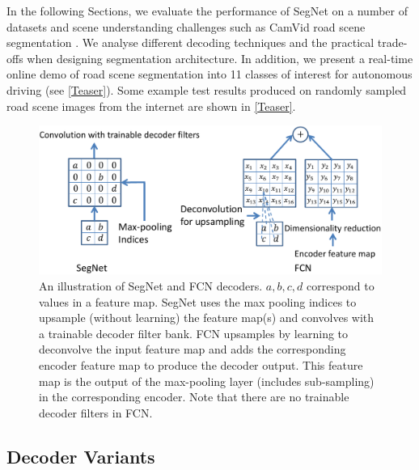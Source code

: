 In the following Sections, we evaluate the performance of SegNet on a number of datasets \citep{pascal,hariharan2011semantic} and scene understanding challenges such as CamVid road scene segmentation \citep{brostow2009semantic}. We analyse different decoding techniques and the practical trade-offs when designing segmentation architecture. In addition, we present a real-time online demo of road scene segmentation into 11 classes of interest for autonomous driving (see \cref{Teaser}). Some example test results produced on randomly sampled road scene images from the internet are shown in \cref{Teaser}.

\begin{figure}
\centering
\includegraphics[width=\textwidth]{segnet/decoderVariantsNew.pdf}
\caption[SegNet decoder.]{An illustration of SegNet and FCN \citep{long2015fully} decoders. $a,b,c,d$ correspond to values in a feature map. SegNet uses the max pooling indices to upsample (without learning) the feature map(s) and convolves with a trainable decoder filter bank. FCN upsamples by learning to deconvolve the input feature map and adds the corresponding encoder feature map to produce the decoder output. This feature map is the output of the max-pooling layer (includes sub-sampling) in the corresponding encoder. Note that there are no trainable decoder filters in FCN.}
\label{Upsampling}
\end{figure}

\subsection{Decoder Variants}
\label{Variants}

